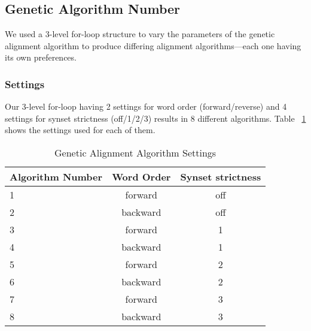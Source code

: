 
\subsection{Genetic Algorithm Number}%
We used a 3-level for-loop structure to vary the parameters of the genetic alignment algorithm to produce differing alignment algorithms---each one having its own preferences. 

\subsubsection{Settings}
Our 3-level for-loop having 2 settings for word order (forward/reverse) and 4 settings for synset strictness (off/1/2/3) results in 8 different algorithms. Table ~\ref{tab:settings} shows the settings used for each of them.%

\begin{table}[center]
	\centering
	\begin{tabular} {|l | c | c |}
		\hline	\textbf{Algorithm Number} & \textbf{Word Order} & \textbf{Synset strictness}\\
		\hline	1	&	forward		&	off	\\
		\hline	2	&	backward	&	off	\\
		\hline	3	&	forward		&	1	\\
		\hline	4	&	backward	&	1	\\
		\hline	5	&	forward		&	2	\\
		\hline	6	&	backward	&	2	\\
		\hline	7	&	forward		&	3	\\
		\hline	8	&	backward	&	3	\\ \hline
	\end{tabular}
	\caption{Genetic Alignment Algorithm Settings}
	\label{tab:settings}
\end{table}

